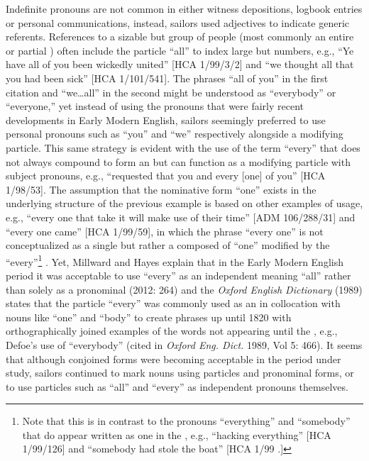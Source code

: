 Indefinite pronouns are not common in either witness depositions, logbook entries or personal communications, instead, sailors used adjectives to indicate generic referents. References to a sizable but  group of people (most commonly an entire or partial ) often include the particle “all” to index large but  numbers, e.g., “Ye have all of you been wickedly united” [HCA 1/99/3/2] and “we thought all that you had been sick” [HCA 1/101/541]. The phrases “all of you” in the first citation and “we…all” in the second might be understood as “everybody” or “everyone,” yet instead of using the  pronouns that were fairly recent developments in Early Modern English, sailors seemingly preferred to use personal pronouns such as “you” and “we” respectively alongside a modifying particle. This same strategy is evident with the use of the term “every” that does not always compound to form an   but can function as a modifying  particle with subject pronouns, e.g., “requested that you and every [one] of you” [HCA 1/98/53]. The assumption that the nominative form “one” exists in the underlying structure of the previous example is based on other examples of usage, e.g., “every one that take it will make use of their time” [ADM 106/288/31] and “every one came” [HCA 1/99/59], in which the phrase “every one” is not conceptualized as a single  but rather a  composed of “one” modified by the  “every”\footnote{Note that this is in contrast to the  pronouns “everything” and “somebody” that do appear written as one  in the , e.g., “hacking everything” [HCA 1/99/126] and “somebody had stole the boat” [HCA 1/99  \citealt{Islands1722}.]} . Yet, Millward and Hayes explain that in the Early Modern English period it was acceptable to use “every” as an independent  meaning “all” rather than solely as a pronominal  (2012: 264) and the \textit{Oxford English Dictionary} (1989) states that the particle “every” was commonly used as an  in collocation with nouns like “one” and “body” to create   phrases up until 1820 with orthographically joined examples of the words not appearing until the , e.g.,  Defoe’s use of “everybody” (cited in \textit{Oxford Eng. Dict.} 1989, Vol 5: 466). It seems that although conjoined forms were becoming acceptable in the period under study, sailors continued to mark  nouns using  particles and pronominal forms, or to use particles such as “all” and “every” as independent pronouns themselves.

